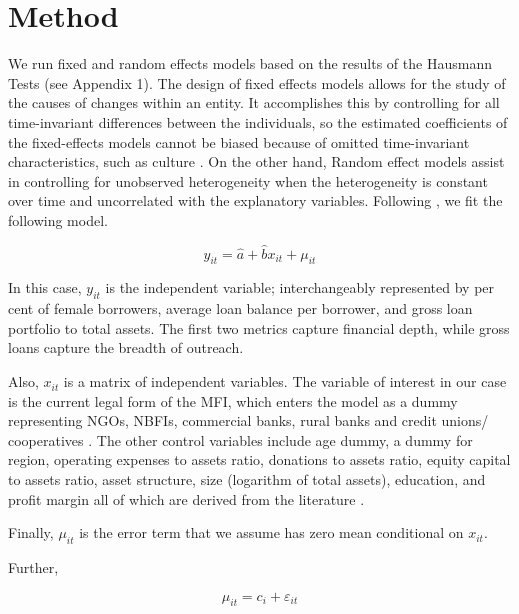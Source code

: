 \documentclass[a4paper,nobind]{templates/ociamthesis}
\begin{document}
\hypertarget{method}{%
\section{\texorpdfstring{\textbf{Method}}{Method}}\label{method}}

We run fixed and random effects models based on the results of the Hausmann Tests (see Appendix 1). The design of fixed effects models allows for the study of the causes of changes within an entity. It accomplishes this by controlling for all time-invariant differences between the individuals, so the estimated coefficients of the fixed-effects models cannot be biased because of omitted time-invariant characteristics, such as culture \autocite{torres2007panel}. On the other hand, Random effect models assist in controlling for unobserved heterogeneity when the heterogeneity is constant over time and uncorrelated with the explanatory variables. Following \textcite{roberts2013endogeneity}, we fit the following model.

\begin{equation}
y_{it} = \hat{a} + \hat{b}x_{it} + \mu_{it}
\end{equation}

In this case, \(y_{it}\) is the independent variable; interchangeably represented by per cent of female borrowers, average loan balance per borrower, and gross loan portfolio to total assets. The first two metrics capture financial depth, while gross loans capture the breadth of outreach.

Also, \(x_{it}\) is a matrix of independent variables. The variable of interest in our case is the current legal form of the MFI, which enters the model as a dummy representing NGOs, NBFIs, commercial banks, rural banks and credit unions/ cooperatives \autocite{ayyagari2013financing}. The other control variables include age dummy, a dummy for region, operating expenses to assets ratio, donations to assets ratio, equity capital to assets ratio, asset structure, size (logarithm of total assets), education, and profit margin all of which are derived from the literature \autocite{ayyagari2013financing,d2017ngos,d2013unsubsidized}.

Finally, \(\mu_{it}\) is the error term that we assume has zero mean conditional on \(x_{it}\).

Further,

\begin{equation}
\mu_{it} = c_{i} + \varepsilon_{it}
\end{equation}
\end{document}
